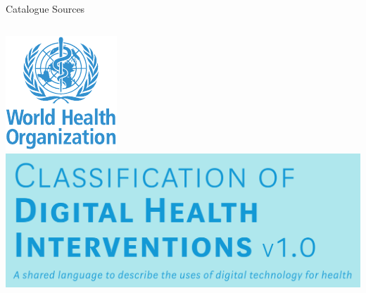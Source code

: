 \documentclass[aspectratio=1610,12pt]{beamer}
\newcommand{\enquote}[1]{{\glqq#1\grqq{}}}
\begin{document}
\begin{frame}{Catalogue Sources}
  \begin{columns}
    \includegraphics[width=\textwidth]{img/WHOLogo.pdf}
    \includegraphics[width=\textwidth]{img/dhi.png}
\end{columns}
\end{frame}
\end{document}

